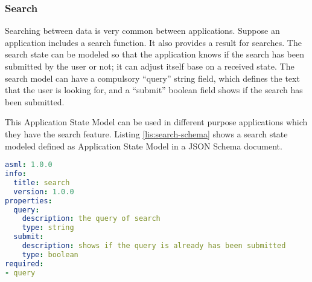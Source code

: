 \subsubsection{Search}
Searching between data is very common between applications. Suppose an application includes a search function. It also provides a result for searches. The search state can be modeled so that the application knows if the search has been submitted by the user or not; it can adjust itself base on a received state. The search model can have a compulsory “query” string field, which defines the text that the user is looking for, and a “submit” boolean field shows if the search has been submitted.

This Application State Model can be used in different purpose applications which they have the search feature. Listing \ref{lis:search-schema} shows a search state modeled defined as Application State Model in a JSON Schema document.

\lstset{
  label=lis:search-schema, caption=Search example Application State Model as JSON Schema in YAML.
}
\begin{lstlisting}[language=yaml]
asml: 1.0.0
info:
  title: search
  version: 1.0.0
properties:
  query:
    description: the query of search
    type: string
  submit:
    description: shows if the query is already has been submitted
    type: boolean
required:
- query
\end{lstlisting}
